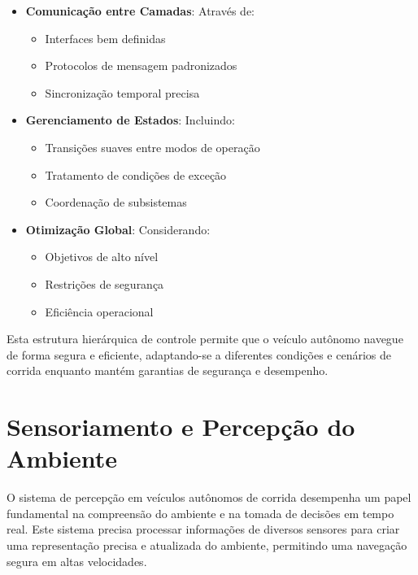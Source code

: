 \begin{itemize}
    \item \textbf{Comunicação entre Camadas}: Através de:
          \begin{itemize}
              \item Interfaces bem definidas
              \item Protocolos de mensagem padronizados
              \item Sincronização temporal precisa
          \end{itemize}

    \item \textbf{Gerenciamento de Estados}: Incluindo:
          \begin{itemize}
              \item Transições suaves entre modos de operação
              \item Tratamento de condições de exceção
              \item Coordenação de subsistemas
          \end{itemize}

    \item \textbf{Otimização Global}: Considerando:
          \begin{itemize}
              \item Objetivos de alto nível
              \item Restrições de segurança
              \item Eficiência operacional
          \end{itemize}
\end{itemize}

Esta estrutura hierárquica de controle permite que o veículo autônomo navegue
de forma segura e eficiente, adaptando-se a diferentes condições e cenários de
corrida enquanto mantém garantias de segurança e desempenho.

\section{Sensoriamento e Percepção do Ambiente}

O sistema de percepção em veículos autônomos de corrida desempenha um papel
fundamental na compreensão do ambiente e na tomada de decisões em tempo real.
Este sistema precisa processar informações de diversos sensores para criar uma
representação precisa e atualizada do ambiente, permitindo uma navegação segura
em altas velocidades.

